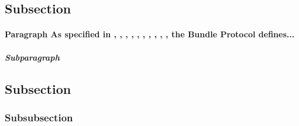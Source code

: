 \subsection{Subsection}
\paragraph{Paragraph
As specified in 
\cite{rfc9171}, 
\cite{rfc4838}, 
\cite{rfc5598}, 
\cite{rfc6238}, 
\cite{rfc6749}, 
\cite{rfc7208}, 
\cite{rfc6376}, 
\cite{fall2003delay}, 
\cite{jain2004routing}, 
\cite{rfc5321}, 
the Bundle Protocol defines...}
\subparagraph{Subparagraph}

\subsection{Subsection}

\subsubsection{Subsubsection}